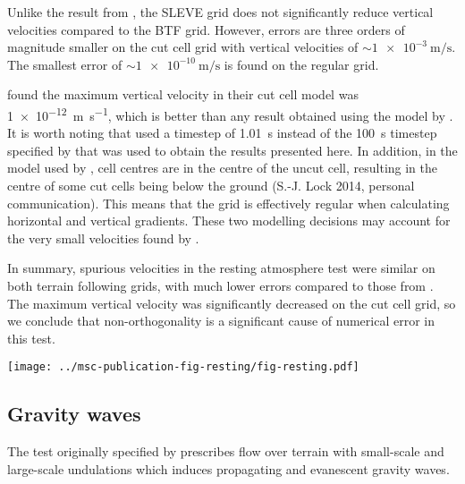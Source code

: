 \documentclass[twocol]{ametsoc}
\begin{document}
Unlike the result from \citet{klemp2011}, the SLEVE grid does not significantly reduce vertical velocities compared to the BTF grid.  However, errors are three orders of magnitude smaller on the cut cell grid with vertical velocities of \(\sim \SI{1e-3}{\meter\per\second}\).  The smallest error of \(\sim \SI{1e-10}{\meter\per\second}\) is found on the regular grid.

\citet{good2014} found the maximum vertical velocity in their cut cell model was \SI{1e-12}{\meter\per\second}, which is better than any result obtained using the model by \citet{weller-shahrokhi2014}.  It is worth noting that \citet{good2014} used a timestep of \SI{1.01}{\second} instead of the \SI{100}{\second} timestep specified by \citet{klemp2011} that was used to obtain the results presented here.  In addition, in the model used by \citet{good2014}, cell centres are in the centre of the uncut cell, resulting in the centre of some cut cells being below the ground (S.-J. Lock 2014, personal communication).  This means that the grid is effectively regular when calculating horizontal and vertical gradients.  These two modelling decisions may account for the very small velocities found by \citet{good2014}.

In summary, spurious velocities in the resting atmosphere test were similar on both terrain following grids, with much lower errors compared to those from \citet{klemp2011}.  The maximum vertical velocity was significantly decreased on the cut cell grid, so we conclude that non-orthogonality is a significant cause of numerical error in this test.

\begin{figure*}
	\centering
	\texttt{[image: ../msc-publication-fig-resting/fig-resting.pdf]}
%
	\caption{Maximum spurious vertical velocity, \(w\) (\si{\meter\per\second}), in the resting atmosphere test with results on (a) BTF, SLEVE, Hybrid Terrain Following (HTF) and Smoothed Terrain Following (STF) coordinates from \citet{klemp2011}, (b) BTF, SLEVE, cut cell and regular grids using the model from \citet{weller-shahrokhi2014}.  Note that vertical scales differ.}
	\label{fig:resting}
\end{figure*}

\subsection{Gravity waves}
The test originally specified by \citet{schaer2002} prescribes flow over terrain with small-scale and large-scale undulations which induces propagating and evanescent gravity waves.
\end{document}
